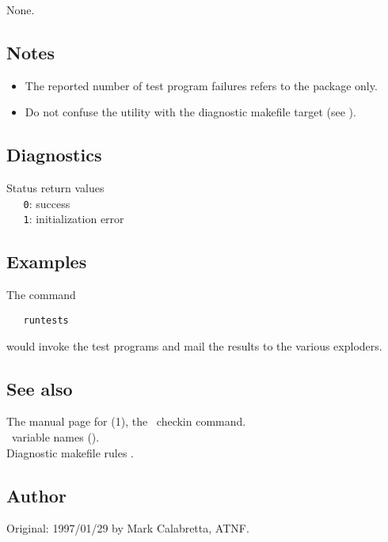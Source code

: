 None.
 
\subsection*{Notes}
 
\begin{itemize}
\item
   The reported number of test program failures refers to the 
   package only.

\item
   Do not confuse the  utility with the 
   diagnostic makefile target (see ).
\end{itemize}
 
\subsection*{Diagnostics}
 
Status return values
\\ \verb+   0+: success
\\ \verb+   1+: initialization error\\
 
\subsection*{Examples}
 
The command
 
\begin{verbatim}
   runtests
\end{verbatim}
 
\noindent
would invoke the test programs and mail the results to the various exploders.
 
\subsection*{See also}
 
The manual page for (1), the \rcs\ checkin command.\\
\aipspp\ variable names ().\\
Diagnostic makefile rules .
 
\subsection*{Author}
 
Original: 1997/01/29 by Mark Calabretta, ATNF.

